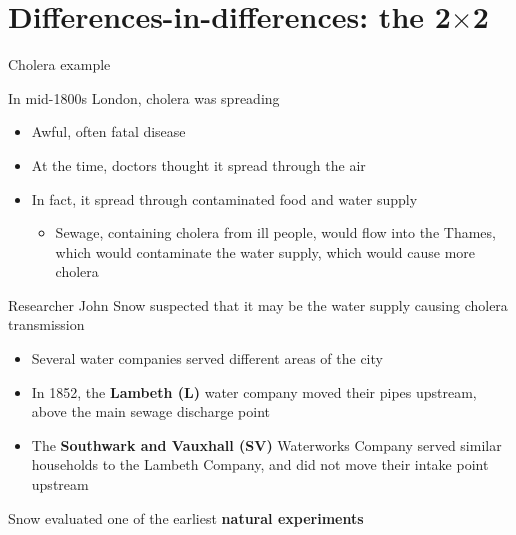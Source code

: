 \documentclass[compress, 8pt]{beamer}
\begin{document}
\section[The 2$\times$2]{Differences-in-differences: the 2$\times$2}
\miniframesoff
\begin{frame}
    \tableofcontents[currentsection]
\end{frame}
\miniframeson

\begin{frame}{Cholera example}

In mid-1800s London, cholera was spreading
\begin{itemize}
    \item Awful, often fatal disease
    \item At the time, doctors thought it spread through the air
    \item In fact, it spread through contaminated food and water supply
    \begin{itemize}
        \item Sewage, containing cholera from ill people, would flow into the Thames, which would contaminate the water supply, which would cause more cholera
    \end{itemize}
\end{itemize}

Researcher John Snow suspected that it may be the water supply causing cholera transmission
\begin{itemize}
    \item Several water companies served different areas of the city
    \item In 1852, the \textbf{Lambeth (L)} water company moved their pipes upstream, above the main sewage discharge point
    \item The \textbf{Southwark and Vauxhall (SV)} Waterworks Company served similar households to the Lambeth Company, and did not move their intake point upstream
\end{itemize}
Snow evaluated one of the earliest \textbf{natural experiments}

\end{frame}
\end{document}
